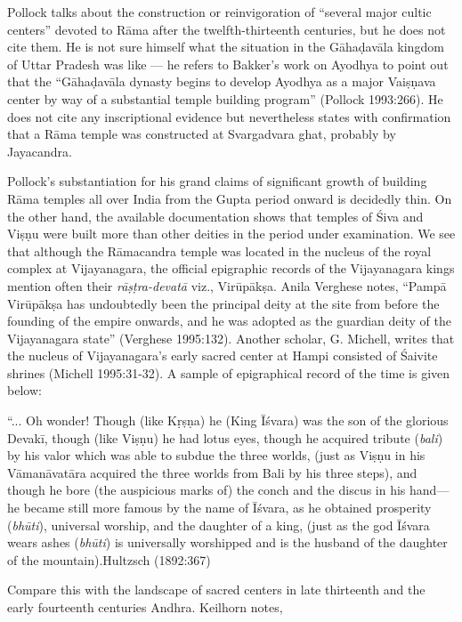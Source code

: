Pollock talks about the construction or reinvigoration of “several major cultic centers” devoted to Rāma after the twelfth-thirteenth centuries, but he does not cite them. He is not sure himself what the situation in the Gāhaḍavāla kingdom of Uttar Pradesh was like — he refers to Bakker’s work on Ayodhya to point out that the “Gāhaḍavāla dynasty begins to develop Ayodhya as a major Vaiṣṇava center by way of a substantial temple building program” (Pollock 1993:266). He does not cite any inscriptional evidence but nevertheless states with confirmation that a Rāma temple was constructed at Svargadvara ghat, probably by Jayacandra. 

Pollock’s substantiation for his grand claims of significant growth of building Rāma temples all over India from the Gupta period onward is decidedly thin. On the other hand, the available documentation shows that temples of Śiva and Viṣṇu were built more than other deities in the period under examination. We see that although the Rāmacandra temple was located in the nucleus of the royal complex at Vijayanagara, the official epigraphic records of the Vijayanagara kings mention often their {\sl rāṣṭra-devatā} viz., Virūpākṣa. Anila Verghese notes, “Pampā Virūpākṣa has undoubtedly been the principal deity at the site from before the founding of the empire onwards, and he was adopted as the guardian deity of the Vijayanagara state” (Verghese 1995:132). Another scholar, G. Michell, writes that the nucleus of Vijayanagara’s early sacred center at Hampi consisted of Śaivite shrines (Michell 1995:31-32). A sample of epigraphical record of the time is given below:

\begin{myquote}
“...  Oh wonder! Though (like Kṛṣṇa) he (King Īśvara) was the son of the glorious Devakī, though (like Viṣṇu) he had lotus eyes, though he acquired tribute ({\sl bali}) by his valor which was able to subdue the three worlds, (just as Viṣṇu in his Vāmanāvatāra acquired the three worlds from Bali by his three steps), and though he bore (the auspicious marks of) the conch and the discus in his hand— he became still more famous by the name of Īśvara, as he obtained prosperity ({\sl bhūti}), universal worship, and the daughter of a king, (just as the god Īśvara wears ashes ({\sl bhūti}) is universally worshipped and is the husband of the daughter of the mountain).\hfill Hultzsch (1892:367)
\end{myquote}

Compare this with the landscape of sacred centers in late thirteenth and the early fourteenth centuries Andhra. Keilhorn notes, 

